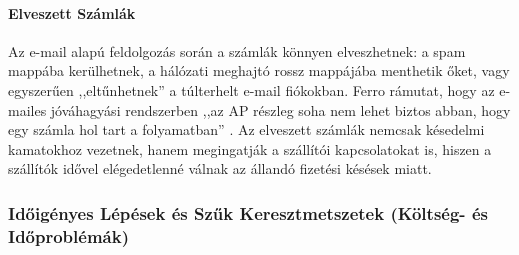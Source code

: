 \paragraph{Elveszett Számlák}
Az e-mail alapú feldolgozás során a számlák könnyen elveszhetnek: a spam mappába kerülhetnek, a hálózati meghajtó rossz mappájába menthetik őket, vagy egyszerűen ,,eltűnhetnek'' a túlterhelt e-mail fiókokban.
Ferro rámutat, hogy az e-mailes jóváhagyási rendszerben ,,az AP részleg soha nem lehet biztos abban, hogy egy számla hol tart a folyamatban'' \cite{Edenredpay-5-Problems}.
Az elveszett számlák nemcsak késedelmi kamatokhoz vezetnek, hanem megingatják a szállítói kapcsolatokat is, hiszen a szállítók idővel elégedetlenné válnak az állandó fizetési késések miatt.


\subsubsection{Időigényes Lépések és Szűk Keresztmetszetek (Költség- és Időproblémák)}

